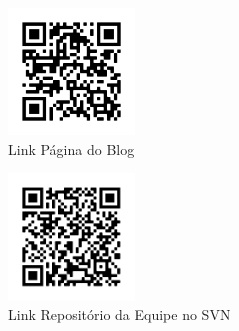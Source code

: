 \documentclass[
    12pt,               %
    openright,          %
    oneside,
    a4paper,            %
    BIBLATEX,           %
    TODO,               %
    english,            %
    brazil              %
    ]{ifsp-spo-inf-ctds}
\begin{document}
    \begin{figure}[htb!]
        \centering
        \includegraphics[width=0.3\textwidth]{qrcode/qrcode_BLOG.png}
        \caption{Link Página do Blog}
        \label{fig:qrcode_BLOG}
    \end{figure}
    
    \begin{figure}[htb!]
        \centering
        \includegraphics[width=0.3\textwidth]{qrcode/svn.png}
        \caption{Link Repositório da Equipe no SVN}
        \label{fig:svn}
    \end{figure}



\postextual


%



\end{document}
